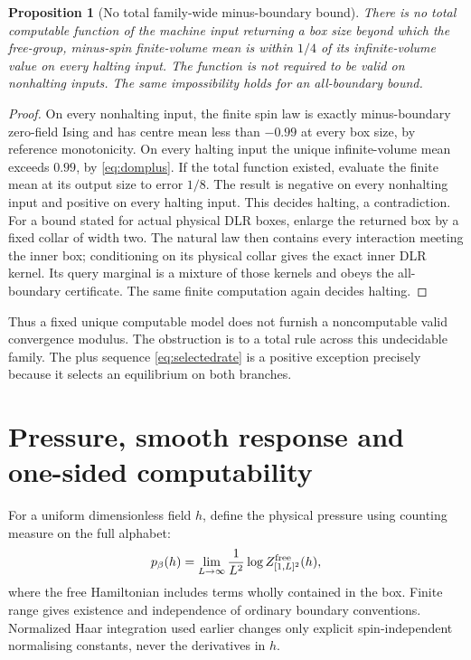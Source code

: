 \documentclass[11pt,reqno]{amsart}
\numberwithin{equation}{section}
\newtheorem{proposition}[theorem]{Proposition}
\theoremstyle{definition}
\theoremstyle{remark}
\begin{document}
\begin{proposition}[No total family-wide minus-boundary bound]\label{prop:nototal}
There is no total computable function of the machine input returning a box size beyond which the free-group, minus-spin finite-volume mean is within $1/4$ of its infinite-volume value on every halting input. The function is not required to be valid on nonhalting inputs. The same impossibility holds for an all-boundary bound.
\end{proposition}
\begin{proof}
On every nonhalting input, the finite spin law is exactly minus-boundary zero-field Ising and has centre mean less than $-0.99$ at every box size, by reference monotonicity. On every halting input the unique infinite-volume mean exceeds $0.99$, by \eqref{eq:domplus}. If the total function existed, evaluate the finite mean at its output size to error $1/8$. The result is negative on every nonhalting input and positive on every halting input. This decides halting, a contradiction. For a bound stated for actual physical DLR boxes, enlarge the returned box by a fixed collar of width two. The natural law then contains every interaction meeting the inner box; conditioning on its physical collar gives the exact inner DLR kernel. Its query marginal is a mixture of those kernels and obeys the all-boundary certificate. The same finite computation again decides halting.
\end{proof}

Thus a fixed unique computable model does not furnish a noncomputable valid convergence modulus. The obstruction is to a total rule across this undecidable family. The plus sequence \eqref{eq:selectedrate} is a positive exception precisely because it selects an equilibrium on both branches.


\section{Pressure, smooth response and one-sided computability}\label{sec:pressure}

For a uniform dimensionless field $h$, define the physical pressure using counting measure on the full alphabet:
\[
 p_\beta(h)=\lim_{L\to\infty}\frac1{L^2}\log Z_{[1,L]^2}^{\rm free}(h),
\]
where the free Hamiltonian includes terms wholly contained in the box. Finite range gives existence and independence of ordinary boundary conventions. Normalized Haar integration used earlier changes only explicit spin-independent normalising constants, never the derivatives in $h$.
\end{document}
